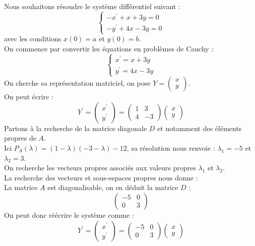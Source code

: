 \begin{ex}
Nous souhaitons résoudre le système différentiel suivant :
$$\begin{cases}
-x^{\prime}+x+3y = 0\\
-y^{\prime}+4x-3y = 0
\end{cases}$$
avec les conditions $x(0)=a$ et $y(0)=b$.\\
On commence par convertir les équations en problèmes de Cauchy :
$$\begin{cases}
x^{\prime}=x+3y\\
y^{\prime}=4x-3y
\end{cases}$$
On cherche sa représentation matriciel, on pose $Y=\begin{pmatrix}x\\y\end{pmatrix}$.\\
On peut écrire :
$$Y^{\prime}=\begin{pmatrix}x^{\prime}\\y^{\prime}\end{pmatrix}=\begin{pmatrix}1&3\\4&-3\end{pmatrix}\begin{pmatrix}x\\y\end{pmatrix}$$
Partons à la recherche de la matrice diagonale $D$ et notamment des éléments propres de $A$.\\
Ici $P_A(\lambda)=(1-\lambda)(-3-\lambda)-12$, sa résolution nous renvoie : $\lambda_1=-5$ et $\lambda_2=3$.\\
On recherche les vecteurs propres associés aux valeurs propres $\lambda_1$ et $\lambda_2$.\\
La recherche des vecteurs et sous-espaces propres nous donne :\\
La matrice $A$ est diagonalisable, on en déduit la matrice $D$ :
$$\begin{pmatrix}-5&0\\0&3\end{pmatrix}$$
On peut donc réécrire le système comme :
$$Y^{\prime}=\begin{pmatrix}x^{\prime}\\y^{\prime}\end{pmatrix}=\begin{pmatrix}-5&0\\0&3\end{pmatrix}\begin{pmatrix}x\\y\end{pmatrix}$$

\end{ex}
